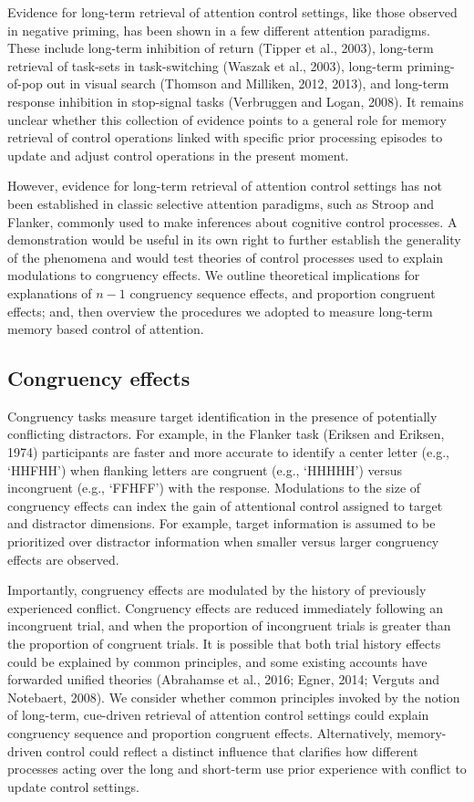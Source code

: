 \documentclass[]{DissertateCUNY}
\begin{document}
Evidence for long-term retrieval of attention control settings, like
those observed in negative priming, has been shown in a few different
attention paradigms. These include long-term inhibition of return
(Tipper et al., 2003), long-term retrieval of task-sets in
task-switching (Waszak et al., 2003), long-term priming-of-pop out in
visual search (Thomson and Milliken, 2012, 2013), and long-term response
inhibition in stop-signal tasks (Verbruggen and Logan, 2008). It remains
unclear whether this collection of evidence points to a general role for
memory retrieval of control operations linked with specific prior
processing episodes to update and adjust control operations in the
present moment.

However, evidence for long-term retrieval of attention control settings
has not been established in classic selective attention paradigms, such
as Stroop and Flanker, commonly used to make inferences about cognitive
control processes. A demonstration would be useful in its own right to
further establish the generality of the phenomena and would test
theories of control processes used to explain modulations to congruency
effects. We outline theoretical implications for explanations of \(n-1\)
congruency sequence effects, and proportion congruent effects; and, then
overview the procedures we adopted to measure long-term memory based
control of attention.

\hypertarget{congruency-effects}{%
\subsection{Congruency effects}\label{congruency-effects}}

Congruency tasks measure target identification in the presence of
potentially conflicting distractors. For example, in the Flanker task
(Eriksen and Eriksen, 1974) participants are faster and more accurate to
identify a center letter (e.g., `HHFHH') when flanking letters are
congruent (e.g., `HHHHH') versus incongruent (e.g., `FFHFF') with the
response. Modulations to the size of congruency effects can index the
gain of attentional control assigned to target and distractor
dimensions. For example, target information is assumed to be prioritized
over distractor information when smaller versus larger congruency
effects are observed.

Importantly, congruency effects are modulated by the history of
previously experienced conflict. Congruency effects are reduced
immediately following an incongruent trial, and when the proportion of
incongruent trials is greater than the proportion of congruent trials.
It is possible that both trial history effects could be explained by
common principles, and some existing accounts have forwarded unified
theories (Abrahamse et al., 2016; Egner, 2014; Verguts and Notebaert,
2008). We consider whether common principles invoked by the notion of
long-term, cue-driven retrieval of attention control settings could
explain congruency sequence and proportion congruent effects.
Alternatively, memory-driven control could reflect a distinct influence
that clarifies how different processes acting over the long and
short-term use prior experience with conflict to update control
settings.
\end{document}
